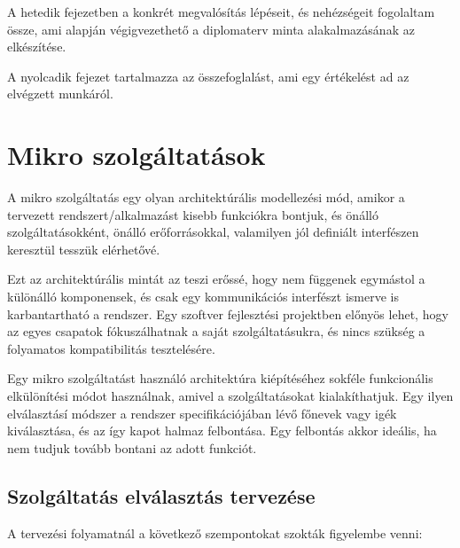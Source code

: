\documentclass[11pt,magyar,a4paper,oneside,]{report}
\begin{document}
A hetedik fejezetben a konkrét megvalósítás lépéseit, és nehézségeit
fogolaltam össze, ami alapján végigvezethető a diplomaterv minta
alakalmazásának az elkészítése.

A nyolcadik fejezet tartalmazza az összefoglalást, ami egy értékelést ad
az elvégzett munkáról.

\chapter{Mikro szolgáltatások\citep{microservices} \citep{micro-arch}
\citep{microservices-light}}\label{mikro-szolguxe1ltatuxe1sokmicroservices-micro-arch-microservices-light}

A mikro szolgáltatás egy olyan architektúrális modellezési mód, amikor a
tervezett rendszert/alkalmazást kisebb funkciókra bontjuk, és önálló
szolgáltatásokként, önálló erőforrásokkal, valamilyen jól definiált
interfészen keresztül tesszük elérhetővé.

Ezt az architektúrális mintát az teszi erőssé, hogy nem függenek
egymástol a különálló komponensek, és csak egy kommunikációs interfészt
ismerve is karbantartható a rendszer. Egy szoftver fejlesztési
projektben előnyös lehet, hogy az egyes csapatok fókuszálhatnak a saját
szolgáltatásukra, és nincs szükség a folyamatos kompatibilitás
tesztelésére.

Egy mikro szolgáltatást használó architektúra kiépítéséhez sokféle
funkcionális elkülönítési módot használnak, amivel a szolgáltatásokat
kialakíthatjuk. Egy ilyen elválasztásí módszer a rendszer
specifikációjában lévő főnevek vagy igék kiválasztása, és az így kapot
halmaz felbontása. Egy felbontás akkor ideális, ha nem tudjuk tovább
bontani az adott funkciót.

\section{Szolgáltatás elválasztás
tervezése}\label{szolguxe1ltatuxe1s-elvuxe1lasztuxe1s-tervezuxe9se}

A tervezési folyamatnál a következő szempontokat szokták figyelembe
venni:
\end{document}
